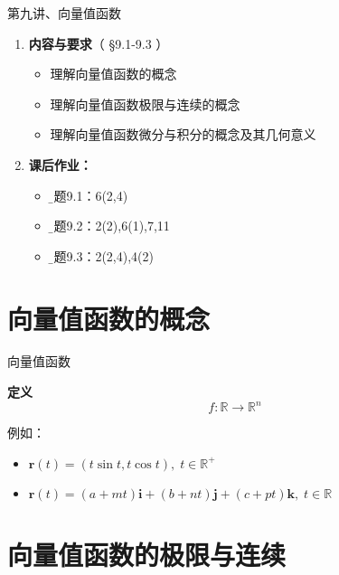 
\begin{frame}{第九讲、向量值函数}
	\linespread{1.5}
	\begin{enumerate}
	  \item {\bf 内容与要求}{\color{blue}（ \S9.1-9.3 ）}
	  \begin{itemize}
	    \item 理解向量值函数的概念
	    \item 理解向量值函数极限与连续的概念
	    \item 理解向量值函数微分与积分的概念及其几何意义
	  \vspace{1em}
	  \end{itemize}
	  \item {\bf  课后作业：}
	  \begin{itemize}
	    \item {\b 习题9.1：6(2,4)}
	    \item {\b 习题9.2：2(2),6(1),7,11}
	    \item {\b 习题9.3：2(2,4),4(2)}
	  \end{itemize}
	\end{enumerate}
\end{frame}

\section{向量值函数的概念}

\begin{frame}{向量值函数}
	\linespread{1.2}\pause 
	\begin{block}{{\bf 定义}\hfill}
		$$f:\mathbb{R}\to\mathbb{R}^n$$
	\end{block}\pause 
	例如：
	\begin{itemize}
	  \item $\bm{r}(t)=(t\sin t, t\cos t),\;t\in\mathbb{R}^+$\pause 
	  \item
	  $\bm{r}(t)=(a+mt)\bm{i}+(b+nt)\bm{j}+(c+pt)\bm{k},\;t\in\mathbb{R}$\pause 
	\end{itemize}
	\begin{center}
	\end{center}
\end{frame}

\section{向量值函数的极限与连续}

